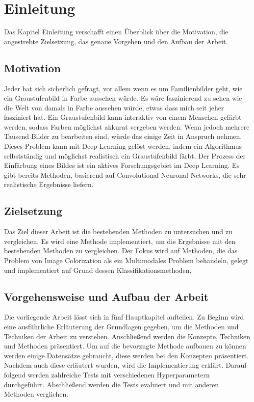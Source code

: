 \chapter{Einleitung}
Das Kapitel Einleitung verschafft einen Überblick über die Motivation, die angestrebte Zielsetzung, das
genaue Vorgehen und den Aufbau der Arbeit.

\section{Motivation}
Jeder hat sich sicherlich gefragt, vor allem wenn es um Familienbilder geht, wie
ein Graustufenbild in Farbe aussehen würde. Es wäre faszinierend zu sehen wie die Welt von damals
in Farbe aussehen würde, etwas dass mich seit jeher fasziniert hat. Ein Graustufenbild kann
interaktiv von einem Menschen gefärbt werden, sodass Farben möglichst akkurat
vergeben werden. Wenn jedoch mehrere Tausend Bilder zu bearbeiten sind, würde das einige
Zeit in Anspruch nehmen. Dieses Problem kann mit Deep Learning gelöst werden, indem
ein Algorithmus selbstständig und möglichst realistisch ein Graustufenbild
färbt. Der Prozess der Einfärbung eines Bildes ist ein aktives Forschungsgebiet
im Deep Learning. Es gibt bereits Methoden, basierend auf Convolutional
Neuronal Networks, die sehr realistische Ergebnisse liefern.

\section{Zielsetzung}
Das Ziel dieser Arbeit ist die bestehenden Methoden zu untersuchen und zu vergleichen. Es wird eine Methode implementiert, um die 
Ergebnisse mit den bestehenden Methoden zu vergleichen. Der Fokus wird auf Methoden, die das Problem von Image Colorization als ein 
Multimodales Problem behandeln, gelegt und implementiert auf Grund dessen Klassifikationsmethoden.

\section{Vorgehensweise und Aufbau der Arbeit}
Die vorliegende Arbeit lässt sich in fünf Hauptkapitel aufteilen. Zu Beginn wird eine ausführliche Erläuterung der Grundlagen gegeben,
um die Methoden und Techniken der Arbeit zu verstehen. Anschließend werden die Konzepte, Techniken und Methoden präsentiert.
Um auf die bevorzugte Methode aufbauen zu können werden einige Datensätze gebraucht, diese werden bei den Konzepten präsentiert.
Nachdem auch diese erläutert wurden, wird die Implementierung erklärt. Darauf folgend werden zahlreiche Tests mit verschiedenen
Hyperparametern durchgeführt. Abschließend werden die Tests evaluiert und mit anderen Methoden verglichen.